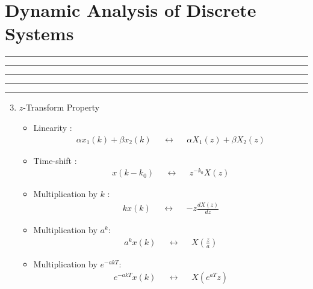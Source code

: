 \setcounter{chapter}{7}
\setcounter{section}{1}
\section{Dynamic Analysis of Discrete Systems}
\vspace{-8pt} \hrule \hrule \hrule \hrule \hrule  \vspace{12pt}


	\begin{enumerate}
		\setcounter{enumi}{2}
		\item $z$-Transform Property
		\begin{itemize}
			\item Linearity : 
				\begin{align*}
					\alpha x_1(k) + \beta x_2(k) &&\leftrightarrow&&   \alpha X_1(z) + \beta X_2(z)
				\end{align*}
			\item Time-shift : 
				\begin{align*}
					x(k-k_0) &&\leftrightarrow&&   z^{-k_0} X(z)
				\end{align*}		
			\item Multiplication by $k$ : 
				\begin{align*}
					k x(k) &&\leftrightarrow&&   -z\frac{dX(z)}{dz}
				\end{align*}		
			\item Multiplication by $a^{k}$: 
				\begin{align*}
					a^{k}x(k) &&\leftrightarrow&&   X(\frac{z}{a})
				\end{align*}						
			\item Multiplication by $e^{-akT}$: 
				\begin{align*}
					e^{-akT} x(k) &&\leftrightarrow&& X(e^{aT}z)
				\end{align*}		
			\end{itemize}				

	\end{enumerate}

